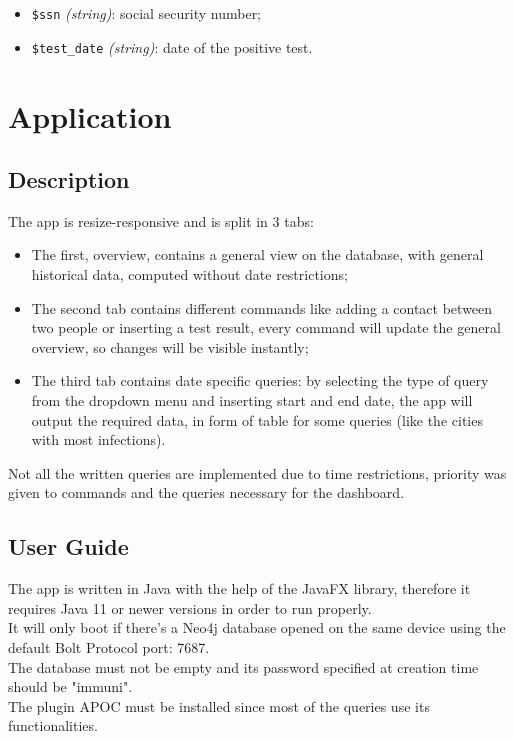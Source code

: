 \documentclass[12pt, a4paper]{article}
\begin{document}
\begin{itemize}
    \item \texttt{\$ssn} \emph{(string)}: social security number;
    \item \texttt{\$test\_date} \emph{(string)}: date of the positive test.
\end{itemize}

\clearpage

\section{Application}

\subsection{Description}

The app is resize-responsive and is split in 3 tabs: 
\begin{itemize}
    \item The first, overview, contains a general view on the database, with 
        general historical data, computed without date restrictions;
    \item The second tab contains different commands like adding a contact 
        between two people or inserting a test result, every command will 
        update the general overview, so changes will be visible instantly;
    \item The third tab contains date specific queries: by selecting the 
        type of query from the dropdown menu and inserting start and end date, 
        the app will output the required data, in form of table for some 
        queries (like the cities with most infections).
\end{itemize}

\noindent %
Not all the written queries are implemented due to time restrictions, priority
was given to commands and the queries necessary for the dashboard.

\subsection{User Guide}

The app is written in Java with the help of the JavaFX library, therefore it 
requires Java 11 or newer versions in order to run properly. \\
It will only boot if there's a Neo4j database opened on the same device using 
the default Bolt Protocol port: 7687. \\
The database must not be empty and its password specified at creation time
should be "immuni". \\ 
The plugin APOC must be installed since most of the queries use its 
functionalities.
\end{document}
